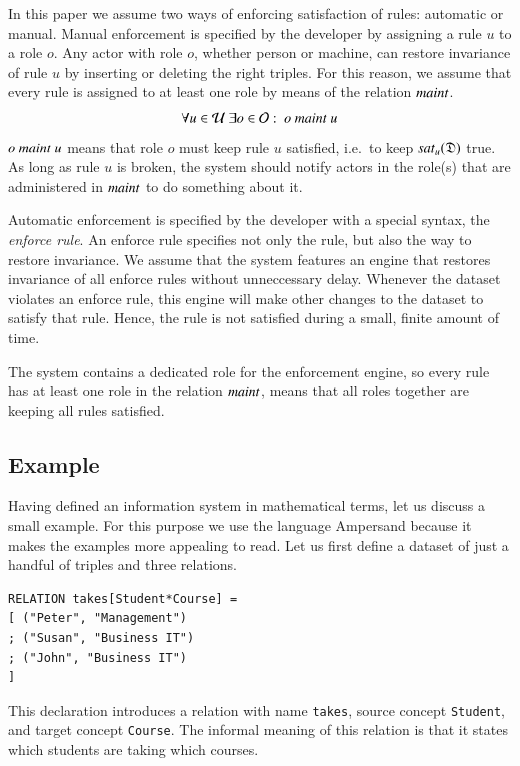 \documentclass{elsarticle}
\begin{document}
   In this paper we assume two ways of enforcing satisfaction of rules: automatic or manual.
   Manual enforcement is specified by the developer by assigning a rule $u$ to a role $o$.
   Any actor with role $o$, whether person or machine,
   can restore invariance of rule $u$ by inserting or deleting the right triples.
   For this reason, we assume that every rule is assigned to at least one role by means of the relation $\text{\it maint\/}$.
\begin{equation}
   \forall u\in\rules\ \exists o\in\roles:\ o\ \maintain\ u\label{eqn:maintain}
\end{equation}
   $o\ \maintain\ u$ means that role $o$ must keep rule $u$ satisfied, i.e.\ to keep $\text{\it sat\/}_{u}(\mathfrak{D})$ true.
   As long as rule $u$ is broken, the system should notify actors in the role(s) that are administered in $\text{\it maint\/}$ to do something about it.

   Automatic enforcement is specified by the developer with a special syntax,
   the {\em enforce rule}.
   An enforce rule specifies not only the rule, but also the way to restore invariance.
   We assume that the system features an engine that restores invariance of all enforce rules without unneccessary delay.
   Whenever the dataset violates an enforce rule,
   this engine will make other changes to the dataset to satisfy that rule.
   Hence, the rule is not satisfied during a small, finite amount of time.

   The system contains a dedicated role for the enforcement engine,
   so every rule has at least one role in the relation $\text{\it maint\/}$, means that all roles together are keeping all rules satisfied.

\subsection{Example}
\label{old IS}
   Having defined an information system in mathematical terms, let us discuss a small example.
   For this purpose we use the language Ampersand
   because it makes the examples more appealing to read.
   Let us first define a dataset of just a handful of triples and three relations.
\begin{verbatim}
RELATION takes[Student*Course] =
[ ("Peter", "Management")
; ("Susan", "Business IT")
; ("John", "Business IT")
]
\end{verbatim}
   This declaration introduces a relation with name \verb#takes#,
   source concept \verb#Student#, and
   target concept \verb#Course#.
   The informal meaning of this relation is that it states which students are taking which courses.
\end{document}
